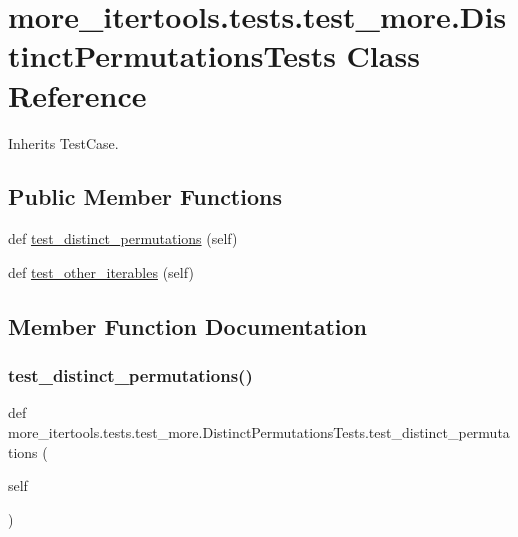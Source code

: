 \hypertarget{classmore__itertools_1_1tests_1_1test__more_1_1_distinct_permutations_tests}{}\section{more\+\_\+itertools.\+tests.\+test\+\_\+more.\+Distinct\+Permutations\+Tests Class Reference}
\label{classmore__itertools_1_1tests_1_1test__more_1_1_distinct_permutations_tests}


Inherits Test\+Case.

\subsection*{Public Member Functions}
\begin{DoxyCompactItemize}
\item 
def \hyperlink{classmore__itertools_1_1tests_1_1test__more_1_1_distinct_permutations_tests_a0de93c8a279abcc07f610fc19073085a}{test\+\_\+distinct\+\_\+permutations} (self)
\item 
def \hyperlink{classmore__itertools_1_1tests_1_1test__more_1_1_distinct_permutations_tests_a004b268104d5321c571d6fc592949ea5}{test\+\_\+other\+\_\+iterables} (self)
\end{DoxyCompactItemize}


\subsection{Member Function Documentation}
\mbox{\label{classmore__itertools_1_1tests_1_1test__more_1_1_distinct_permutations_tests_a0de93c8a279abcc07f610fc19073085a}} 
\subsubsection{\texorpdfstring{test\+\_\+distinct\+\_\+permutations()}{test\_distinct\_permutations()}}
{\footnotesize\ttfamily def more\+\_\+itertools.\+tests.\+test\+\_\+more.\+Distinct\+Permutations\+Tests.\+test\+\_\+distinct\+\_\+permutations (\begin{DoxyParamCaption}\item[{}]{self }\end{DoxyParamCaption})}

